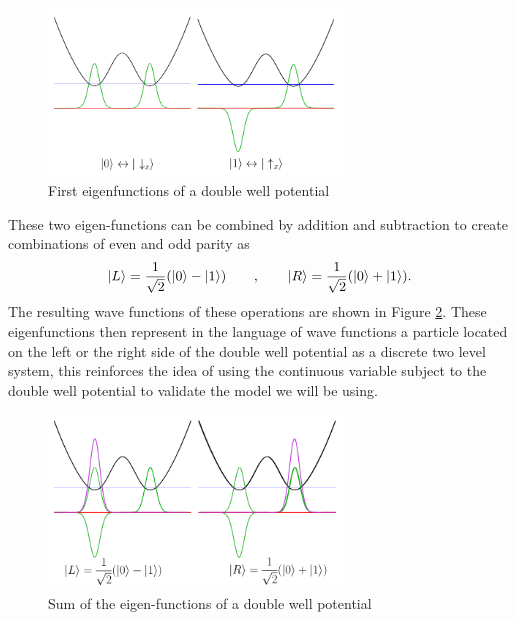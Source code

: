 \begin{figure}[H]
\centering
\includegraphics[width=0.7\textwidth]{Figures/eigen_functions.png}

\caption{First eigenfunctions of a double well potential}
\label{fig:double_well_eigen}
\end{figure}

These two eigen-functions can be combined by addition and subtraction to create combinations of even and odd parity as 
\begin{equation}
\ket{L}=\frac{1}{\sqrt{2}}(\ket{0}-\ket{1})\qquad,\qquad \ket{R}=\frac{1}{\sqrt{2}}(\ket{0}+\ket{1}).
\end{equation}
The resulting wave functions of these operations are shown in Figure \ref{fig:double_well_eigen_sum}. These eigenfunctions then represent in the language of wave functions a particle located on the left or the right side of the double well potential as a discrete two level system, this reinforces the idea of using the continuous variable subject to the double well potential to validate the model we will be using.

\begin{figure}[H]
\centering
\includegraphics[width=0.7\textwidth]{Figures/eigen_functions_sum.png}

\caption{Sum of the eigen-functions of a double well potential}
\label{fig:double_well_eigen_sum}


\end{figure}



